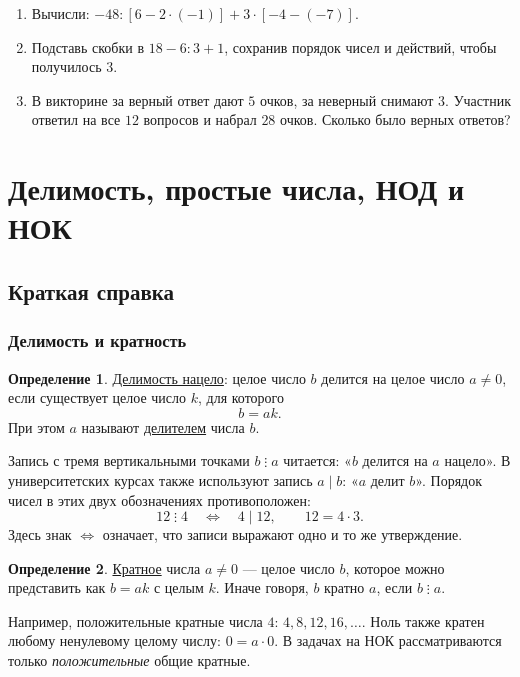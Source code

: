 \documentclass[12pt,a4paper]{article}
\theoremstyle{definition}
\newtheorem{definition}{Определение}[section]
\theoremstyle{plain}
\theoremstyle{remark}
\newcommand{\term}[1]{\uline{#1}}
\newcommand{\starmark}{\ensuremath{{}^{\ast}}}
\begin{document}
\begin{enumerate}[label=\thesection.\arabic*.,leftmargin=2.8em,itemsep=12pt]
\item[\textbf{1.14.}\starmark] Вычисли: \(- 48 : [6 - 2 \cdot  (- 1)] + 3 \cdot  [- 4 - (- 7)]\).
\item[\textbf{1.15.}\starmark] Подставь скобки в \(18 - 6 : 3 + 1\), сохранив порядок чисел и действий, чтобы получилось \(3\).
\item[\textbf{1.16.}\starmark] В викторине за верный ответ дают \(5\) очков, за неверный снимают \(3\). Участник ответил на все \(12\) вопросов и набрал \(28\) очков. Сколько было верных ответов?
\end{enumerate}
\clearpage
\section{Делимость, простые числа, НОД и НОК}
\subsection*{Краткая справка}
\subsubsection*{Делимость и кратность}

\begin{definition}
\term{Делимость нацело}: целое число \(b\) делится на целое число \(a\ne0\),
если существует целое число \(k\), для которого
\[
b=ak.
\]
При этом \(a\) называют \term{делителем} числа \(b\).
\end{definition}

Запись с тремя вертикальными точками \(b\mathrel{\vdots}a\) читается:
«\(b\) делится на \(a\) нацело».
В университетских курсах также используют запись \(a\mid b\): «\(a\) делит \(b\)».
Порядок чисел в этих двух обозначениях противоположен:
\[
12\mathrel{\vdots}4\quad\Longleftrightarrow\quad4\mid12,
\qquad 12=4\cdot3.
\]
Здесь знак \(\Longleftrightarrow\) означает, что записи выражают одно и то же утверждение.

\begin{definition}
\term{Кратное} числа \(a\ne0\) --- целое число \(b\), которое можно представить как \(b=ak\)
с целым \(k\). Иначе говоря, \(b\) кратно \(a\), если \(b\mathrel{\vdots}a\).
\end{definition}

Например, положительные кратные числа \(4\): \(4,8,12,16,\ldots\).
Ноль также кратен любому ненулевому целому числу: \(0=a\cdot0\).
В задачах на НОК рассматриваются только \emph{положительные} общие кратные.
\end{document}
